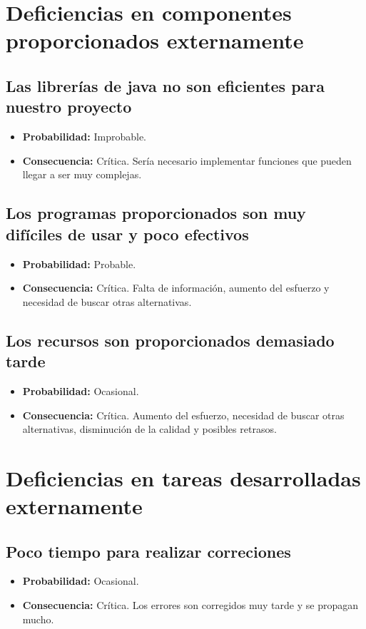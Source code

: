 \documentclass[spanish,a4paper,11pt, twoside]{report}	%
\begin{document}
%
\section{Deficiencias en componentes proporcionados externamente}

	\subsection*{Las librerías de java no son eficientes para nuestro proyecto}	
		\begin{itemize}
			\item \textbf {Probabilidad: }Improbable.
			\item \textbf {Consecuencia: }Crítica. Sería necesario implementar funciones que pueden llegar a ser muy complejas.
		\end{itemize}
	
	\subsection*{Los programas proporcionados son muy difíciles de usar y poco efectivos}	
		\begin{itemize}
			\item \textbf {Probabilidad: }Probable.
			\item \textbf {Consecuencia: }Crítica. Falta de información, aumento del esfuerzo y necesidad de buscar otras alternativas.
		\end{itemize}
	
	\subsection*{Los recursos son proporcionados demasiado tarde}	
		\begin{itemize}
			\item \textbf {Probabilidad: }Ocasional.
			\item \textbf {Consecuencia: }Crítica. Aumento del esfuerzo, necesidad de buscar otras alternativas, disminución de la calidad y posibles retrasos.
		\end{itemize}

%
\section{Deficiencias en tareas desarrolladas externamente}

	\subsection*{Poco tiempo para realizar correciones}	
		\begin{itemize}
			\item \textbf {Probabilidad: }Ocasional.
			\item \textbf {Consecuencia: }Crítica. Los errores son corregidos muy tarde y se propagan mucho.
		\end{itemize}
\end{document}

